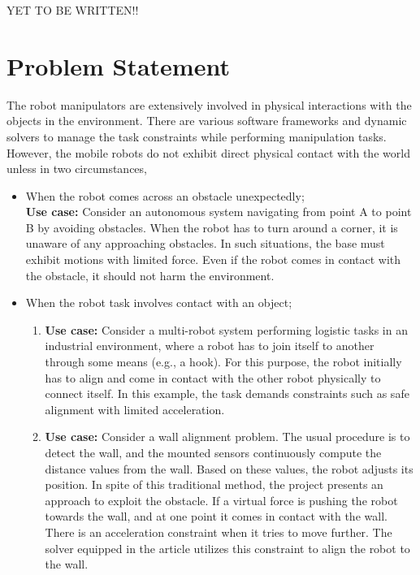 YET TO BE WRITTEN!!



\section{Problem Statement} \label{sec:problem}

The robot manipulators are extensively involved in physical interactions with the objects in the environment. There are various software frameworks and dynamic solvers to manage the task constraints while performing manipulation tasks. However, the mobile robots do not exhibit direct physical contact with the world unless in two circumstances,

\begin{itemize}
	\item When the robot comes across an obstacle unexpectedly; \\ \textbf{Use case:} Consider an autonomous system navigating from point A to point B by avoiding obstacles. When the robot has to turn around a corner, it is unaware of any approaching obstacles. In such situations, the base must exhibit motions with limited force. Even if the robot comes in contact with the obstacle, it should not harm the environment.
	\item When the robot task involves contact with an object; \begin{enumerate}
		\item \textbf{Use case:} Consider a multi-robot system performing logistic tasks in an industrial environment, where a robot has to join itself to another through some means (e.g., a hook). For this purpose, the robot initially has to align and come in contact with the other robot physically to connect itself. In this example, the task demands constraints such as safe alignment with limited acceleration.
		\item \textbf{Use case:} Consider a wall alignment problem. The usual procedure is to detect the wall, and the mounted sensors continuously compute the distance values from the wall. Based on these values, the robot adjusts its position. In spite of this traditional method, the project presents an approach to exploit the obstacle. If a virtual force is pushing the robot towards the wall, and at one point it comes in contact with the wall. There is an acceleration constraint when it tries to move further. The solver equipped in the article utilizes this constraint to align the robot to the wall.
	\end{enumerate}

\end{itemize}
